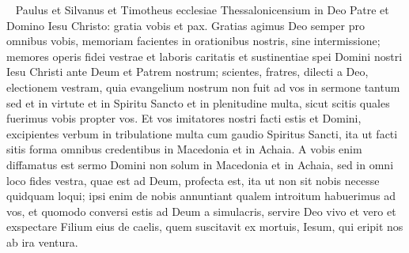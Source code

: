 
\begin{biblechapter}   
\verse Paulus et Silvanus et Timotheus ecclesiae Thessalonicensium in Deo Patre et Domino Iesu Christo: gratia vobis et pax. 
\verse Gratias agimus Deo semper pro omnibus vobis, memoriam facientes in orationibus nostris, sine intermissione; 
\verse memores operis fidei vestrae et laboris caritatis et sustinentiae spei Domini nostri Iesu Christi ante Deum et Patrem nostrum; 
\verse scientes, fratres, dilecti a Deo, electionem vestram, 
\verse quia evangelium nostrum non fuit ad vos in sermone tantum sed et in virtute et in Spiritu Sancto et in plenitudine multa, sicut scitis quales fuerimus vobis propter vos. 
\verse Et vos imitatores nostri facti estis et Domini, excipientes verbum in tribulatione multa cum gaudio Spiritus Sancti, 
\verse ita ut facti sitis forma omnibus credentibus in Macedonia et in Achaia. 
\verse A vobis enim diffamatus est sermo Domini non solum in Macedonia et in Achaia, sed in omni loco fides vestra, quae est ad Deum, profecta est, ita ut non sit nobis necesse quidquam loqui;  
\verse ipsi enim de nobis annuntiant qualem introitum habuerimus ad vos, et quomodo conversi estis ad Deum a simulacris, servire Deo vivo et vero 
\verse et exspectare Filium eius de caelis, quem suscitavit ex mortuis, Iesum, qui eripit nos ab ira ventura. 
\end{biblechapter}

